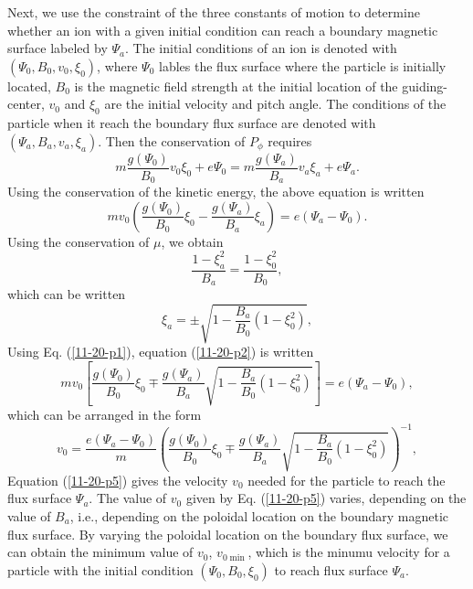 \documentclass{article}
\begin{document}
Next, we use the constraint of the three constants of motion to determine
whether an ion with a given initial condition can reach a boundary magnetic
surface labeled by $\Psi_a$. The initial conditions of an ion is denoted with
$(\Psi_0, B_0, v_0, \xi_0)$, where $\Psi_0$ lables the flux surface where the
particle is initially located, $B_0$ is the magnetic field strength at the
initial location of the guiding-center, $v_0$ and $\xi_0$ are the initial
velocity and pitch angle. The conditions of the particle when it reach the
boundary flux surface are denoted with $(\Psi_a, B_a, v_a, \xi_a)$. Then the
conservation of $P_{\phi}$ requires
\begin{equation}
  m \frac{g (\Psi_0)}{B_0} v_0 \xi_0 + e \Psi_0 = m \frac{g (\Psi_a)}{B_a} v_a
  \xi_a + e \Psi_a .
\end{equation}
Using the conservation of the kinetic energy, the above equation is written
\begin{equation}
  \label{11-20-p2} m v_0 \left( \frac{g (\Psi_0)}{B_0} \xi_0 - \frac{g
  (\Psi_a)}{B_a} \xi_a \right) = e (\Psi_a - \Psi_0) .
\end{equation}
Using the conservation of $\mu$, we obtain
\begin{equation}
  \frac{1 - \xi_a^2}{B_a} = \frac{1 - \xi_0^2}{B_0},
\end{equation}
which can be written
\begin{equation}
  \label{11-20-p1} \xi_a = \pm \sqrt{1 - \frac{B_a}{B_0} (1 - \xi_0^2)},
\end{equation}
Using Eq. (\ref{11-20-p1}), equation (\ref{11-20-p2}) is written
\begin{equation}
  \label{11-20-1} m v_0 \left[ \frac{g (\Psi_0)}{B_0} \xi_0 \mp \frac{g
  (\Psi_a)}{B_a} \sqrt{1 - \frac{B_a}{B_0} (1 - \xi_0^2)} \right] = e (\Psi_a
  - \Psi_0),
\end{equation}
which can be arranged in the form
\begin{equation}
  \label{11-20-p5} v_0 = \frac{e (\Psi_a - \Psi_0)}{m}  \left( \frac{g
  (\Psi_0)}{B_0} \xi_0 \mp \frac{g (\Psi_a)}{B_a} \sqrt{1 - \frac{B_a}{B_0} (1
  - \xi_0^2)} \right)^{- 1},
\end{equation}
Equation (\ref{11-20-p5}) gives the velocity $v_0$ needed for the particle to
reach the flux surface $\Psi_a$. The value of $v_0$ given by Eq.
(\ref{11-20-p5}) varies, depending on the value of $B_a$, i.e., depending on
the poloidal location on the boundary magnetic flux surface. By varying the
poloidal location on the boundary flux surface, we can obtain the minimum
value of $v_0$, $v_{0 \min}$, which is the minumu velocity for a particle with
the initial condition $(\Psi_0, B_0, \xi_0)$ to reach flux surface $\Psi_a$.
\end{document}

